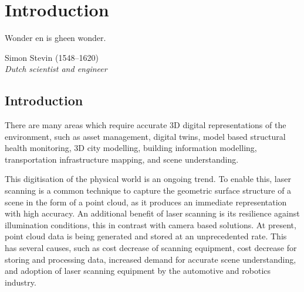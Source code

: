\chapter{Introduction}
\epigraph{Wonder en is gheen wonder.}{Simon Stevin (1548--1620)\\\textit{Dutch scientist and engineer}}

\section{Introduction}
There are many areas which require accurate 3D digital representations of the environment, such as asset management, digital twins, model based structural health monitoring, 3D city modelling, building information modelling, transportation infrastructure mapping, and scene understanding.

This digitisation of the physical world is an ongoing trend. To enable this, laser scanning is a common technique to capture the geometric surface structure of a scene in the form of a point cloud, as it produces an immediate representation with high accuracy. An additional benefit of laser scanning is its resilience against illumination conditions, this in contrast with camera based solutions. At present, point cloud data is being generated and stored at an unprecedented rate. This has several causes, such as cost decrease of scanning equipment, cost decrease for storing and processing data, increased demand for accurate scene understanding, and adoption of laser scanning equipment by the automotive and robotics industry.

